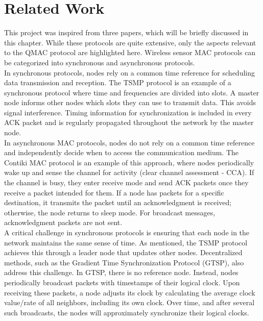 \section*{Related Work}





This project was inspired from three papers, which will be briefly discussed in this chapter. While these protocols are quite extensive, only the aspects relevant to the QMAC protocol are highlighted here. Wireless sensor MAC protocols can be categorized into synchronous and asynchronous protocols.\\

In synchronous protocols, nodes rely on a common time reference for scheduling data transmission and reception. The TSMP protocol is an example of a synchronous protocol where time and frequencies are divided into slots. A master node informs other nodes which slots they can use to transmit data. This avoids signal interference. Timing information for synchronization is included in every ACK packet and is regularly propagated throughout the network by the master node.\cite{TSMP}\\

In asynchronous MAC protocols, nodes do not rely on a common time reference and independently decide when to access the communication medium. The Contiki MAC protocol is an example of this approach, where nodes periodically wake up and sense the channel for activity (clear channel assessment - CCA). If the channel is busy, they enter receive mode and send ACK packets once they receive a packet intended for them. If a node has packets for a specific destination, it transmits the packet until an acknowledgment is received; otherwise, the node returns to sleep mode. For broadcast messages, acknowledgment packets are not sent.\\

A critical challenge in synchronous protocols is ensuring that each node in the network maintains the same sense of time. As mentioned, the TSMP protocol achieves this through a leader node that updates other nodes. Decentralized methods, such as the Gradient Time Synchronization Protocol (GTSP), also address this challenge. In GTSP, there is no reference node. Instead, nodes periodically broadcast packets with timestamps of their logical clock. Upon receiving these packets, a node adjusts its clock by calculating the average clock value/rate of all neighbors, including its own clock. Over time, and after several such broadcasts, the nodes will approximately synchronize their logical clocks.




